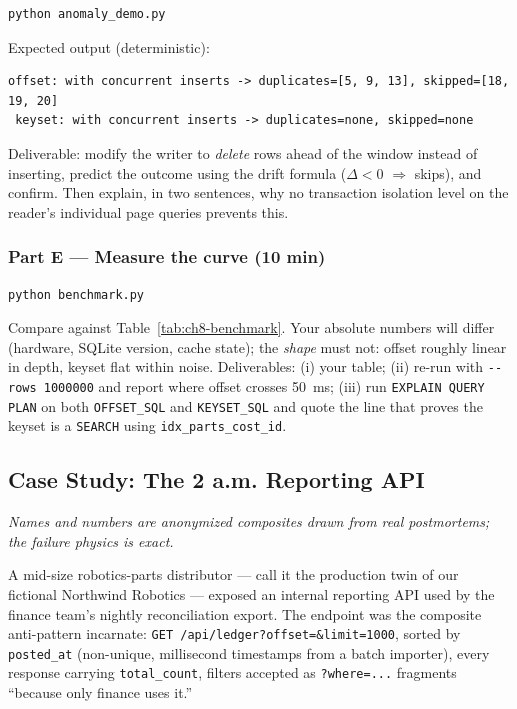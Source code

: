 \begin{verbatim}
python anomaly_demo.py
\end{verbatim}

Expected output (deterministic):

\begin{verbatim}
offset: with concurrent inserts -> duplicates=[5, 9, 13], skipped=[18, 19, 20]
 keyset: with concurrent inserts -> duplicates=none, skipped=none
\end{verbatim}

Deliverable: modify the writer to \emph{delete} rows ahead of the window
instead of inserting, predict the outcome using the drift formula
($\Delta < 0$ $\Rightarrow$ skips), and confirm. Then explain, in two
sentences, why no transaction isolation level on the reader's individual
page queries prevents this.

\subsubsection{Part E --- Measure the curve (10 min)}

\begin{verbatim}
python benchmark.py
\end{verbatim}

Compare against Table~\ref{tab:ch8-benchmark}. Your absolute numbers will
differ (hardware, SQLite version, cache state); the \emph{shape} must not:
offset roughly linear in depth, keyset flat within noise. Deliverables:
(i) your table; (ii) re-run with \texttt{-{}-rows 1000000} and report where
offset crosses 50~ms; (iii) run \texttt{EXPLAIN QUERY PLAN} on both
\texttt{OFFSET\_SQL} and \texttt{KEYSET\_SQL} and quote the line that proves
the keyset is a \texttt{SEARCH} using \texttt{idx\_parts\_cost\_id}.

\subsection{Case Study: The 2 a.m. Reporting API}
\label{sec:ch8-casestudy}

\textit{Names and numbers are anonymized composites drawn from real
postmortems; the failure physics is exact.}

A mid-size robotics-parts distributor --- call it the production twin of
our fictional Northwind Robotics --- exposed an internal reporting API used
by the finance team's nightly reconciliation export. The endpoint was the
composite anti-pattern incarnate: \texttt{GET /api/ledger?offset=\&limit=1000},
sorted by \texttt{posted\_at} (non-unique, millisecond timestamps from a
batch importer), every response carrying \texttt{total\_count}, filters
accepted as \texttt{?where=...} fragments ``because only finance uses it.''


